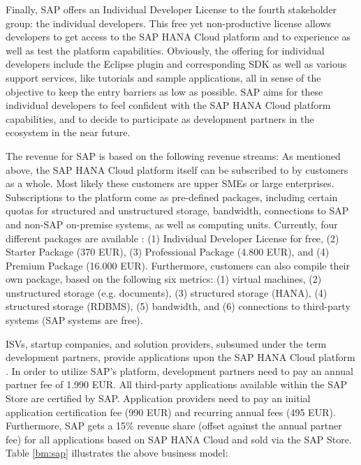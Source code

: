 Finally, SAP offers an Individual Developer License to the fourth stakeholder group: the individual developers. This free yet non-productive license allows developers to get access to the SAP HANA Cloud platform and to experience as well as test the platform capabilities. Obviously, the offering for individual developers include the Eclipse plugin and corresponding \ac{SDK} as well as various support services, like tutorials and sample applications, all in sense of the objective to keep the entry barriers as low as possible. SAP aims for these individual developers to feel confident with the SAP HANA Cloud platform capabilities, and to decide to participate as development partners in the ecosystem in the near future.

The revenue for SAP is based on the following revenue streams: As mentioned above, the SAP HANA Cloud platform itself can be subscribed to by customers as a whole. Most likely these customers are upper \acp{SME} or large enterprises. Subscriptions to the platform come as pre-defined packages, including certain quotas for structured and unstructured storage, bandwidth, connections to SAP and non-SAP on-premise systems, as well as computing units. Currently, four different packages are available \citep{SAP2013b}: (1) Individual Developer License for free, (2) Starter Package (370 \ac{EUR}), (3) Professional Package (4.800 \ac{EUR}), and (4) Premium Package (16.000 \ac{EUR}). Furthermore, customers can also compile their own package, based on the following six metrics: (1) virtual machines, (2) unstructured storage (e.g. documents), (3) structured storage (HANA), (4) structured storage (\ac{RDBMS}), (5) bandwidth, and (6) connections to third-party systems (SAP systems are free). 

\acp{ISV}, startup companies, and solution providers, subsumed under the term development partners, provide applications upon the SAP HANA Cloud platform \citep{SAP2013a}. In order to utilize SAP's platform, development partners need to pay an annual partner fee of 1.990 \ac{EUR}. All third-party applications available within the SAP Store are certified by SAP. Application providers need to pay an initial application certification fee (990 \ac{EUR}) and recurring annual fees (495 \ac{EUR}). Furthermore, SAP gets a 15\% revenue share (offset against the annual partner fee) for all applications based on SAP HANA Cloud and sold via the SAP Store. Table \ref{bm:sap} illustrates the above business model:



